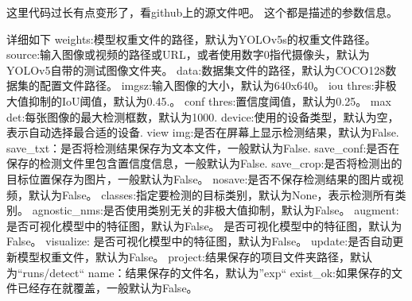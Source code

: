 这里代码过长有点变形了，看github上的源文件吧。
这个都是描述的参数信息。

详细如下
weights:模型权重文件的路径，默认为YOLOv5s的权重文件路径。
source:输入图像或视频的路径或URL，或者使用数字0指代摄像头，默认为YOLOv5自带的测试图像文件夹。
data:数据集文件的路径，默认为COCO128数据集的配置文件路径。
imgsz:输入图像的大小，默认为640x640。
iou thres:非极大值抑制的IoU阈值，默认为0.45.。
conf thres:置信度阈值，默认为0.25。
max det:每张图像的最大检测框数，默认为1000.
device:使用的设备类型，默认为空，表示自动选择最合适的设备.
view img:是否在屏幕上显示检测结果，默认为False.
save_txt：是否将检测结果保存为文本文件，一般默认为False.
save_conf:是否在保存的检测文件里包含置信度信息，一般默认为False.
save_crop:是否将检测出的目标位置保存为图片，一般默认为False。
nosave:是否不保存检测结果的图片或视频，默认为False。
classes:指定要检测的目标类别，默认为None，表示检测所有类别。
agnostic_nms:是否使用类别无关的非极大值抑制，默认为False。
augment:是否可视化模型中的特征图，默认为False。
是否可视化模型中的特征图，默认为False。
visualize:
是否可视化模型中的特征图，默认为False。
update:是否自动更新模型权重文件，默认为False。
project:结果保存的项目文件夹路径，默认为“runs/detect“
name：结果保存的文件名，默认为”exp“
exist_ok:如果保存的文件已经存在就覆盖，一般默认为False。

